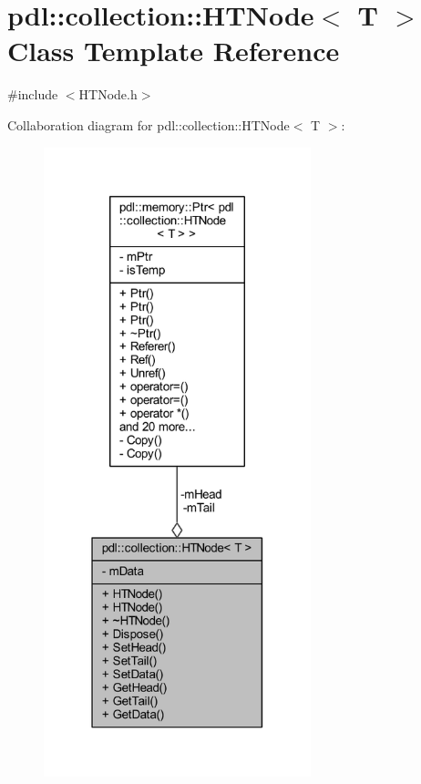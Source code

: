 \hypertarget{classpdl_1_1collection_1_1_h_t_node}{}\section{pdl\+::collection\+::H\+T\+Node$<$ T $>$ Class Template Reference}
\label{classpdl_1_1collection_1_1_h_t_node}


{\ttfamily \#include $<$H\+T\+Node.\+h$>$}



Collaboration diagram for pdl\+::collection\+::H\+T\+Node$<$ T $>$\+:
\nopagebreak
\begin{figure}[H]
\begin{center}
\leavevmode
\includegraphics[width=220pt]{classpdl_1_1collection_1_1_h_t_node__coll__graph}
\end{center}
\end{figure}
